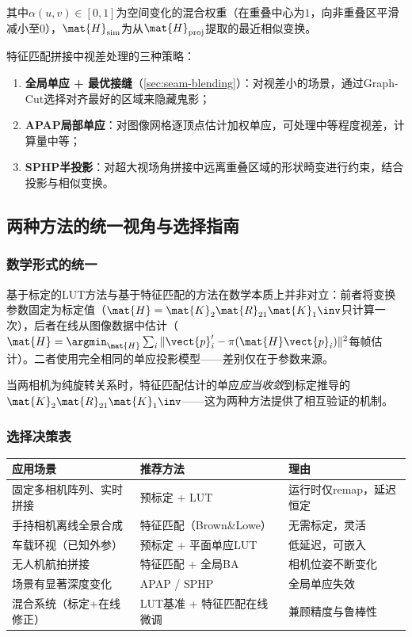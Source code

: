 其中$\alpha(u,v) \in [0,1]$为空间变化的混合权重（在重叠中心为$1$，向非重叠区平滑减小至$0$），$\mat{H}_{\text{sim}}$为从$\mat{H}_{\text{proj}}$提取的最近相似变换。

\begin{finalbox}
特征匹配拼接中视差处理的三种策略：

\begin{enumerate}[leftmargin=*]
  \item \textbf{全局单应 + 最优接缝}（\cref{sec:seam-blending}）：对视差小的场景，通过Graph-Cut选择对齐最好的区域来隐藏鬼影；
  \item \textbf{APAP局部单应}：对图像网格逐顶点估计加权单应，可处理中等程度视差，计算量中等；
  \item \textbf{SPHP半投影}：对超大视场角拼接中远离重叠区域的形状畸变进行约束，结合投影与相似变换。
\end{enumerate}
\end{finalbox}

\subsection{两种方法的统一视角与选择指南}
\label{sec:comparison}

\subsubsection{数学形式的统一}

基于标定的LUT方法与基于特征匹配的方法在数学本质上并非对立：前者将变换参数固定为标定值（$\mat{H} = \mat{K}_2\mat{R}_{21}\mat{K}_1\inv$只计算一次），后者在线从图像数据中估计（$\mat{H} = \argmin_{\mat{H}} \sum_i \|\vect{p}_i' - \pi(\mat{H}\vect{p}_i)\|^2$每帧估计）。二者使用完全相同的单应投影模型——差别仅在于参数来源。

当两相机为纯旋转关系时，特征匹配估计的单应\emph{应当收敛}到标定推导的$\mat{K}_2\mat{R}_{21}\mat{K}_1\inv$——这为两种方法提供了相互验证的机制。

\subsubsection{选择决策表}

\begin{center}
\small
\begin{tabular}{p{4cm}p{4.5cm}p{4.5cm}}
\toprule
\textbf{应用场景} & \textbf{推荐方法} & \textbf{理由} \\
\midrule
固定多相机阵列、实时拼接 & 预标定 + LUT & 运行时仅remap，延迟恒定 \\
手持相机离线全景合成 & 特征匹配（Brown\&Lowe） & 无需标定，灵活 \\
车载环视（已知外参） & 预标定 + 平面单应LUT & 低延迟，可嵌入 \\
无人机航拍拼接 & 特征匹配 + 全局BA & 相机位姿不断变化 \\
场景有显著深度变化 & APAP / SPHP & 全局单应失效 \\
混合系统（标定+在线修正） & LUT基准 + 特征匹配在线微调 & 兼顾精度与鲁棒性 \\
\bottomrule
\end{tabular}
\end{center}

